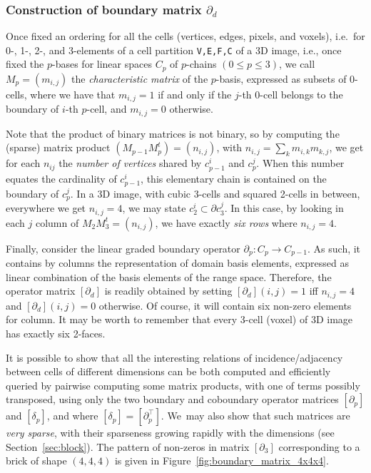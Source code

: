 \documentclass[11pt, oneside]{amsart}   	%
\begin{document}
\subsubsection{Construction of boundary matrix $\partial_d$}

Once fixed an ordering for all the cells (vertices, edges, pixels, and voxels), i.e.~for 0-, 1-, 2-, and 3-elements of a cell partition \texttt{V,E,F,C} of a 3D image, i.e., once fixed the $p$-bases for linear spaces $C_p$ of $p$-chains $(0\leq p\leq 3)$, we call $M_p = (m_{i,j})$ the \emph{characteristic matrix} of the $p$-basis, expressed as subsets of 0-cells, where  we have that $m_{i,j}=1$ if and only if the $j$-th $0$-cell belongs to the boundary of $i$-th $p$-cell, and $m_{i,j}=0$ otherwise.  

Note that the product of binary matrices is not binary, so by computing the (sparse) matrix product $(M_{p-1} M_{p}^t) = (n_{i,j})$, with $n_{i,j} = \sum_{k} m_{i,k}m_{k,j}$, we get for each $n_{ij}$ the \emph{number of vertices} shared by $c_{p-1}^i$ and $c_{p}^j$. When this number equates the cardinality of $c_{p-1}^i$, this elementary chain is contained on the boundary of $c_{p}^j$. In a 3D image, with cubic 3-cells and squared 2-cells in between, everywhere we get $n_{i,j}=4$, we may state $c_{2}^i\subset\partial c_{3}^j$. In this case, by looking in each $j$ column of $M_{2} M_{3}^t = (n_{i,j})$, we have exactly \emph{six rows} where  $n_{i,j} = 4$. 

Finally, consider the linear graded boundary operator $\partial_p : C_p \to C_{p-1}$. As such, it contains by columns the representation of domain basis elements, expressed as linear combination of the basis elements of the range space. Therefore, the operator matrix $[\partial_d]$ is readily obtained by setting $[\partial_d](i,j)=1$ iff $n_{i,j}=4$ and $[\partial_d](i,j)=0$ otherwise.  Of course, it will contain six non-zero elements for column.  It may be worth to remember that every 3-cell (voxel) of 3D image has exactly six 2-faces. 

It is possible to show that all the interesting relations of incidence/adjacency between cells of different dimensions can be both computed and efficiently queried by pairwise computing some matrix products, with one of terms possibly transposed, using only the two boundary and coboundary operator matrices $[\partial_p]$ and $[\delta_p]$, and where $[\delta_p] = [\partial_p^\top]$. We~may also show that such matrices are \emph{very sparse}, with their sparseness growing rapidly with the dimensions (see Section~\ref{sec:block}). The pattern of non-zeros in matrix $[\partial_3]$ corresponding to a brick of shape $(4,4,4)$ is given in Figure~\ref{fig:boundary_matrix_4x4x4}.
\end{document}
